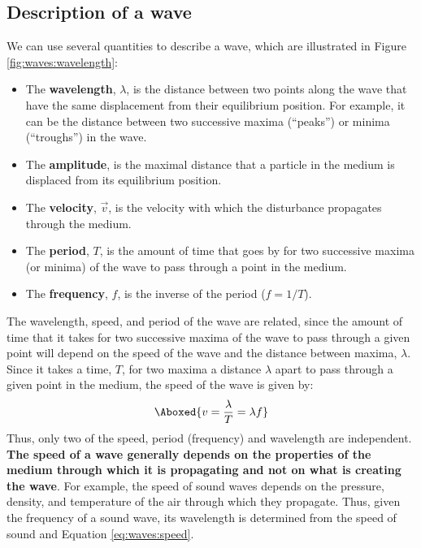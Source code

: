 \subsection{Description of a wave}
We can use several quantities to describe a wave, which are illustrated in Figure \ref{fig:waves:wavelength}:
\begin{itemize}
\item The \textbf{wavelength}, $\lambda$, is the distance between two points along the wave that have the same displacement from their equilibrium position. For example, it can be the distance between two successive maxima (``peaks'') or minima (``troughs'') in the wave.
\item The \textbf{amplitude}, is the maximal distance that a particle in the medium is displaced from its equilibrium position.
\item The \textbf{velocity}, $\vec v$, is the velocity with which the disturbance propagates through the medium.
\item The \textbf{period}, $T$, is the amount of time that goes by for two successive maxima (or minima) of the wave to pass through a point in the medium.
\item The \textbf{frequency}, $f$, is the inverse of the period ($f=1/T$).
\end{itemize}
The wavelength, speed, and period of the wave are related, since the amount of time that it takes for two successive maxima of the wave to pass through a given point will depend on the speed of the wave and the distance between maxima, $\lambda$. Since it takes a time, $T$, for two maxima a distance $\lambda$ apart to pass through a given point in the medium, the speed of the wave is given by:
\begin{align}
\label{eq:waves:speed}
\Aboxed{v = \frac{\lambda}{T}=\lambda f}
\end{align}
Thus, only two of the speed, period (frequency) and wavelength are independent. \textbf{The speed of a wave generally depends on the properties of the medium through which it is propagating and not on what is creating the wave}. For example, the speed of sound waves depends on the pressure, density, and temperature of the air through which they propagate. Thus, given the frequency of a sound wave, its wavelength is determined from the speed of sound and Equation \ref{eq:waves:speed}.

